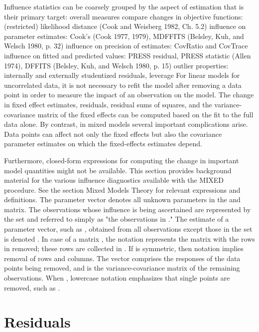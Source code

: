 \documentclass[Chap5amain.tex]{subfiles}
\begin{document}
Influence statistics can be coarsely grouped by the aspect of estimation that is their primary target:
overall measures compare changes in objective functions: (restricted) likelihood distance (Cook and Weisberg 1982, Ch. 5.2)
influence on parameter estimates: Cook’s  (Cook 1977, 1979), MDFFITS (Belsley, Kuh, and Welsch 1980, p. 32)
influence on precision of estimates: CovRatio and CovTrace
influence on fitted and predicted values: PRESS residual, PRESS statistic (Allen 1974), DFFITS (Belsley, Kuh, and Welsch 1980, p. 15)
outlier properties: internally and externally studentized residuals, leverage
For linear models for uncorrelated data, it is not necessary to refit the model after removing a data point in order to measure the impact of an observation on the model. The change in fixed effect estimates, residuals, residual sums of squares, and the variance-covariance matrix of the fixed effects can be computed based on the fit to the full data alone. By contrast, in mixed models several important complications arise. Data points can affect not only the fixed effects but also the covariance parameter estimates on which the fixed-effects estimates depend. 

Furthermore, closed-form expressions for computing the change in important model quantities might not be available.
This section provides background material for the various influence diagnostics available with the MIXED procedure. See the section Mixed Models Theory for relevant expressions and definitions. The parameter vector  denotes all unknown parameters in the  and  matrix.
The observations whose influence is being ascertained are represented by the set  and referred to simply as "the observations in ." The estimate of a parameter vector, such as , obtained from all observations except those in the set  is denoted . In case of a matrix , the notation  represents the matrix with the rows in  removed; these rows are collected in . If  is symmetric, then notation  implies removal of rows and columns. The vector  comprises the responses of the data points being removed, and  is the variance-covariance matrix of the remaining observations. When , lowercase notation emphasizes that single points are removed, such as .

\newpage

\section*{Residuals}
\end{document}
